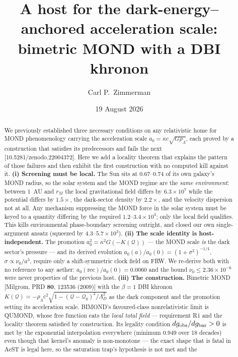 \documentclass[aps,prd,twocolumn,10pt,nofootinbib,superscriptaddress]{revtex4-2}
\newcommand{\QQ}{\mathcal{Q}}
\begin{document}
\title{A host for the dark-energy--anchored acceleration scale:\\
bimetric MOND with a DBI khronon}

\author{Carl P.\ Zimmerman}
\date{19 August 2026}

\begin{abstract}
We previously established three necessary conditions on any relativistic home for MOND
phenomenology carrying the acceleration scale $a_0=\kappa c\sqrt{G\rho_\Lambda}$, each proved by
a construction that satisfies its predecessors and fails the next
[10.5281/zenodo.22004372]. Here we add a locality theorem that explains the pattern of those
failures and then exhibit the first construction with no computed kill against it.
\textbf{(i) Screening must be local.} The Sun sits at $0.67$--$0.74$ of its own galaxy's MOND
radius, so the solar system and the MOND regime are the \emph{same environment}: between 1~AU
and $r_M$ the local gravitational field differs by $6.3\times10^{7}$ while the potential differs
by $1.5\times$, the dark-sector density by $2.2\times$, and the velocity dispersion not at all.
Any mechanism suppressing the MOND force in the solar system must be keyed to a quantity
differing by the required $1.2$--$3.4\times10^{4}$; only the local field qualifies. This kills
environmental phase-boundary screening outright, and closed our own single-argument ansatz
(squeezed by $4.3$--$5.7\times10^{3}$). \textbf{(ii) The scale identity is host-independent.}
The promotion $a_0^2=\kappa^2G(-K(\QQ))$ --- the MOND scale \emph{is} the dark sector's
pressure --- and its derived evolution $a_0(a)/a_0(0)=(1+\sigma^2)^{-1/4}$,
$\sigma\propto\nu_0/a^3$, require only a shift-symmetric clock field on FRW. We re-derive both
with no reference to any aether: $a_0(\mathrm{rec})/a_0(0)=0.0060$ and the bound
$\nu_0\le2.36\times10^{-6}$ were never properties of the previous host.
\textbf{(iii) The construction.} Bimetric MOND [Milgrom, PRD \textbf{80}, 123536 (2009)] with
the $\beta=1$ DBI khronon $K(\QQ)=-\rho_\Lambda c^2\sqrt{1-(\QQ-\QQ_0)^2/\Lambda_D^2}$ as the
dark component and the promotion setting its acceleration scale. BIMOND's favoured-class
nonrelativistic limit is QUMOND, whose free function eats the \emph{local total field} ---
requirement R1 and the locality theorem satisfied by construction. Its legality condition
$dg_{\rm obs}/dg_{\rm bar}>0$ is met by the exponential interpolation everywhere (minimum
$0.949$ over 18 decades) even though that kernel's anomaly is non-monotone --- the exact shape
that is fatal in AeST is legal here, so the saturation trap's hypothesis is not met and the

\end{abstract}
\end{document}
